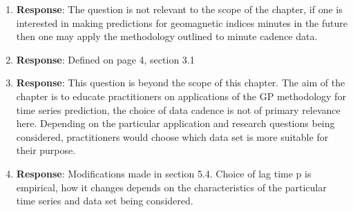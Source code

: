 \documentclass{article}
\begin{document}
\begin{enumerate}
{}

\item{


\textbf{Response}: The question is not relevant to the scope of the
chapter, if one is interested in making predictions for geomagnetic
indices minutes in the future then one may apply the methodology
outlined to minute cadence data.

}

\item{


\textbf{Response}: Defined on page 4, section 3.1

}

\item{


\textbf{Response}: This question is beyond the scope of this
chapter. The aim of the chapter is to educate practitioners on
applications of the GP methodology for time series prediction, the
choice of data cadence is not of primary relevance here. Depending on
the particular application and research questions being considered,
practitioners would choose which data set is more suitable for their purpose.

}

\item{


\textbf{Response}: Modifications made in section 5.4. Choice of lag
time p is empirical, how it changes depends on the characteristics of
the particular time series and data set being considered.

}
\end{enumerate}
\end{document}
